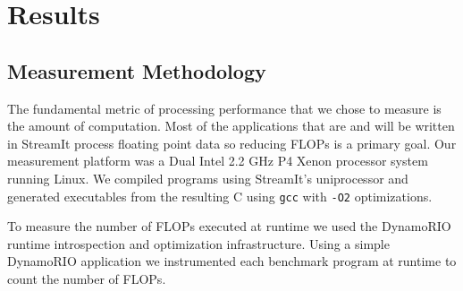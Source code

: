 \section{Results}
\label{sec:results}

\subsection{Measurement Methodology}


The fundamental metric of processing performance that we chose to measure is the 
amount of computation. Most of the applications that are and will
be written in StreamIt process floating point data so reducing FLOPs
is a primary goal. Our measurement platform was a Dual Intel 2.2 GHz P4 Xenon processor system 
running Linux. We compiled programs using StreamIt's uniprocessor
and generated executables from the resulting C using {\tt gcc} with {\tt -O2} optimizations.

To measure the number of FLOPs executed at runtime we used the DynamoRIO\cite{rio-webpage}
runtime introspection and optimization infrastructure. Using a simple DynamoRIO application 
we instrumented each benchmark program at runtime to count the number of FLOPs.

